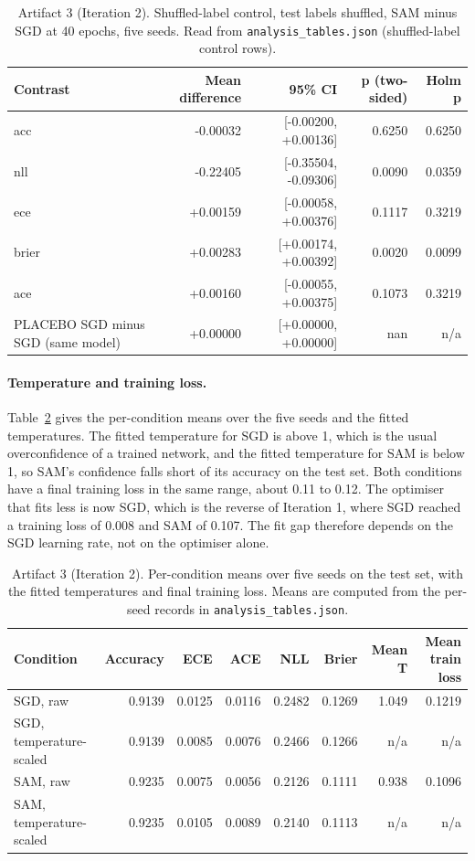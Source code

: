 \documentclass[11pt,letterpaper]{article}
\begin{document}
\begin{table}[!htbp]
\centering
\footnotesize
\caption{Artifact 3 (Iteration 2). Shuffled-label control, test labels shuffled, SAM minus SGD at 40 epochs, five seeds. Read from \texttt{analysis\_tables.json} (shuffled-label control rows).}
\label{tab:placebo}
\begin{tabular}{lrrrr}
\toprule
Contrast & Mean difference & 95\% CI & p (two-sided) & Holm p \\
\midrule
acc & -0.00032 & [-0.00200, +0.00136] & 0.6250 & 0.6250 \\
nll & -0.22405 & [-0.35504, -0.09306] & 0.0090 & 0.0359 \\
ece & +0.00159 & [-0.00058, +0.00376] & 0.1117 & 0.3219 \\
brier & +0.00283 & [+0.00174, +0.00392] & 0.0020 & 0.0099 \\
ace & +0.00160 & [-0.00055, +0.00375] & 0.1073 & 0.3219 \\
PLACEBO SGD minus SGD (same model) & +0.00000 & [+0.00000, +0.00000] & nan & n/a \\
\bottomrule
\end{tabular}
\end{table}

\paragraph{Temperature and training loss.} Table~\ref{tab:cond} gives the per-condition means over the five seeds and the fitted temperatures. The fitted temperature for SGD is above 1, which is the usual overconfidence of a trained network, and the fitted temperature for SAM is below 1, so SAM's confidence falls short of its accuracy on the test set. Both conditions have a final training loss in the same range, about 0.11 to 0.12. The optimiser that fits less is now SGD, which is the reverse of Iteration 1, where SGD reached a training loss of 0.008 and SAM of 0.107. The fit gap therefore depends on the SGD learning rate, not on the optimiser alone.

\begin{table}[!htbp]
\centering
\footnotesize
\caption{Artifact 3 (Iteration 2). Per-condition means over five seeds on the test set, with the fitted temperatures and final training loss. Means are computed from the per-seed records in \texttt{analysis\_tables.json}.}
\label{tab:cond}
\begin{tabular}{lrrrrrrr}
\toprule
Condition & Accuracy & ECE & ACE & NLL & Brier & Mean T & Mean train loss \\
\midrule
SGD, raw & 0.9139 & 0.0125 & 0.0116 & 0.2482 & 0.1269 & 1.049 & 0.1219 \\
SGD, temperature-scaled & 0.9139 & 0.0085 & 0.0076 & 0.2466 & 0.1266 & n/a & n/a \\
SAM, raw & 0.9235 & 0.0075 & 0.0056 & 0.2126 & 0.1111 & 0.938 & 0.1096 \\
SAM, temperature-scaled & 0.9235 & 0.0105 & 0.0089 & 0.2140 & 0.1113 & n/a & n/a \\
\bottomrule
\end{tabular}
\end{table}
\end{document}
